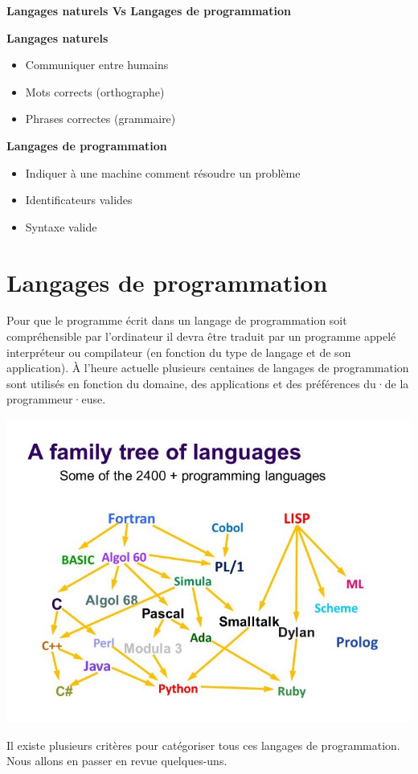 \documentclass[11pt, a4paper]{book}
\begin{document}
\begin{eclairage}
	\textbf{Langages naturels Vs Langages de programmation} 
	\begin{multicols}{2}
		\textbf{Langages naturels}
		\begin{itemize}
			\item Communiquer entre humains
			\item Mots corrects (orthographe)
			\item Phrases correctes (grammaire)
		\end{itemize}
		\newpage
		\textbf{Langages de programmation}
		\begin{itemize}
			\item Indiquer à une machine comment résoudre un problème
			\item Identificateurs valides
			\item Syntaxe valide
		\end{itemize}
	\end{multicols}
\end{eclairage}



\section{Langages de programmation}
Pour que le programme écrit dans un langage de programmation soit compréhensible par l'ordinateur il devra être traduit par un programme appelé interpréteur ou compilateur (en fonction du type de langage et de son application). À l'heure actuelle plusieurs centaines de langages de programmation sont utilisés en fonction du domaine, des applications et des préférences du·de la programmeur·euse.
\begin{center}
	\includegraphics[scale=0.45,trim=0 40 0  160,clip=true]{images/family_tree_languages}
\end{center}
Il existe plusieurs critères pour catégoriser tous ces langages de programmation. Nous allons en passer en revue quelques-uns.
\end{document}
